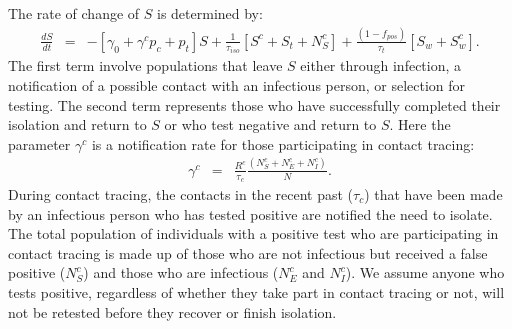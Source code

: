 \documentclass[notitlepage, superscriptaddress]{revtex4-2}
\begin{document}
The rate of change of $S$ is determined by:
\begin{eqnarray}
\label{E:dS}
\frac{dS}{dt} &=& - [\gamma_{0}  + \gamma^{c} p_{c} +p_{t}] S + \frac{1}{\tau_{iso}}[S^{c} + S_{t} + N^{c}_{S}] + \frac{(1-f_{pos})}{\tau_{t}}[S_{w} + S^{c}_{w}].
\end{eqnarray}
The first term involve populations that leave $S$ either through infection, a notification of a possible contact with an infectious person, or selection for testing. The second term represents those who have successfully completed their isolation and return to $S$ or who test negative and return to $S$. Here the parameter $\gamma^{c}$ is a notification rate for those participating in contact tracing:
\begin{eqnarray}
\label{E:notificationrate}
\gamma^{c} &=& \frac{R^{c}}{\tau_{c}} \frac{(N^{c}_{S} + N^{c}_{E} + N^{c}_{I}) }{N}.
\end{eqnarray}
During contact tracing, the contacts in the recent past ($\tau_{c}$) that have been made by an infectious person who has tested positive are notified the need to isolate. The total population of individuals with a positive test who are participating in contact tracing is made up of those who are not infectious but received a false positive ($N^{c}_{S}$) and those who are infectious ($N^{c}_{E}$ and $N^{c}_{I}$). We assume anyone who tests positive, regardless of whether they take part in contact tracing or not, will not be retested before they recover or finish isolation. 
\end{document}
